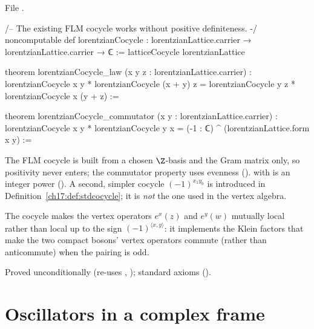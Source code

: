 \noindent File .
\begin{leancode}
/-- The existing FLM cocycle works without positive definiteness. -/
noncomputable def lorentzianCocycle :
    lorentzianLattice.carrier → lorentzianLattice.carrier → ℂ :=
  latticeCocycle lorentzianLattice

theorem lorentzianCocycle_law (x y z : lorentzianLattice.carrier) :
    lorentzianCocycle x y * lorentzianCocycle (x + y) z =
      lorentzianCocycle y z * lorentzianCocycle x (y + z) :=

theorem lorentzianCocycle_commutator (x y : lorentzianLattice.carrier) :
    lorentzianCocycle x y * lorentzianCocycle y x =
      (-1 : ℂ) ^ (lorentzianLattice.form x y) :=
\end{leancode}

\begin{dictionary}
The FLM cocycle is built from a chosen $\Z$-basis and the Gram matrix only, so positivity never enters;
the commutator property uses evenness ().   with 
is an integer power ().  A second, simpler cocycle $(-1)^{x_1y_0}$ is introduced in
Definition~\ref{ch17:def:stdcocycle}; it is \emph{not} the one used in the vertex algebra.
\end{dictionary}

\begin{physics}
The cocycle makes the vertex operators $e^x(z)$ and $e^y(w)$ mutually local rather than local up to the
sign $(-1)^{\langle x,y\rangle}$: it implements the Klein factors that make the two compact bosons' vertex
operators commute (rather than anticommute) when the pairing is odd.
\end{physics}

\begin{status}
Proved unconditionally (re-uses , ); standard
axioms ().
\end{status}

\section{Oscillators in a complex frame}\label{ch17:sec:frame}

